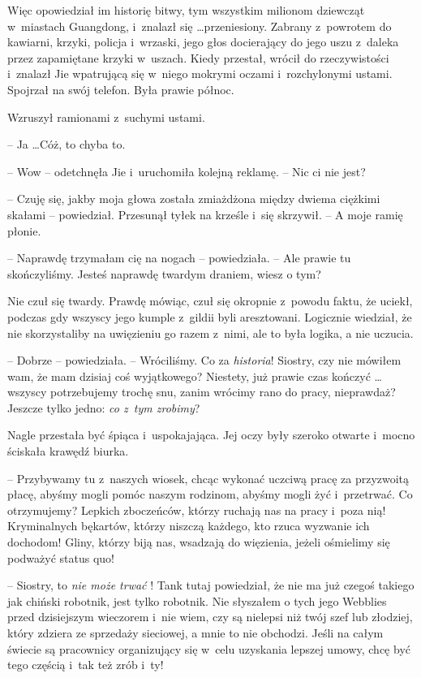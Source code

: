 \documentclass[oneside,polish,11pt,rmheadings]{mwbk}
\begin{document}
Więc opowiedział im historię bitwy, tym wszystkim milionom dziewcząt w~miastach Guangdong, i~znalazł się \ldots  przeniesiony. Zabrany z~powrotem do kawiarni, krzyki, policja i~wrzaski, jego głos docierający do jego uszu z~daleka przez zapamiętane krzyki w~uszach. Kiedy przestał, wrócił do rzeczywistości i~znalazł Jie wpatrującą się w~niego mokrymi oczami i~rozchylonymi ustami. Spojrzał na swój telefon. Była prawie północ.

Wzruszył ramionami z~suchymi ustami. 

-- Ja \ldots  Cóż, to chyba to.

-- Wow -- odetchnęła Jie i~uruchomiła kolejną reklamę. -- Nic ci nie jest? 

-- Czuję się, jakby moja głowa została zmiażdżona między dwiema ciężkimi skałami -- powiedział. Przesunął tyłek na krześle i~się skrzywił. -- A moje ramię płonie.

-- Naprawdę trzymałam cię na nogach -- powiedziała. -- Ale prawie tu skończyliśmy. Jesteś naprawdę twardym draniem, wiesz o tym?

Nie czuł się twardy. Prawdę mówiąc, czuł się okropnie z~powodu faktu, że uciekł, podczas gdy wszyscy jego kumple z~gildii byli aresztowani. Logicznie wiedział, że nie skorzystaliby na uwięzieniu go razem z~nimi, ale to była logika, a nie uczucia.

-- Dobrze -- powiedziała. -- Wróciliśmy. Co za \textit{historia}! Siostry, czy nie mówiłem wam, że mam dzisiaj coś wyjątkowego? Niestety, już prawie czas kończyć \ldots  wszyscy potrzebujemy trochę snu, zanim wrócimy rano do pracy, nieprawdaż? Jeszcze tylko jedno: \textit{co z~tym zrobimy}? 

Nagle przestała być śpiąca i~uspokajająca. Jej oczy były szeroko otwarte i~mocno ściskała krawędź biurka. 

-- Przybywamy tu z~naszych wiosek, chcąc wykonać uczciwą pracę za przyzwoitą płacę, abyśmy mogli pomóc naszym rodzinom, abyśmy mogli żyć i~przetrwać. Co otrzymujemy? Lepkich zboczeńców, którzy ruchają nas na pracy i~poza nią! Kryminalnych bękartów, którzy niszczą każdego, kto rzuca wyzwanie ich dochodom! Gliny, którzy biją nas, wsadzają do więzienia, jeżeli ośmielimy się podważyć status quo!

-- Siostry, to \textit{nie może trwać }! Tank tutaj powiedział, że nie ma już czegoś takiego jak chiński robotnik, jest tylko robotnik. Nie słyszałem o tych jego Webblies przed dzisiejszym wieczorem i~nie wiem, czy są nielepsi niż twój szef lub złodziej, który zdziera ze sprzedaży sieciowej, a mnie to nie obchodzi. Jeśli na całym świecie są pracownicy organizujący się w~celu uzyskania lepszej umowy, chcę być tego częścią i~tak też zrób i~ty!
\end{document}
